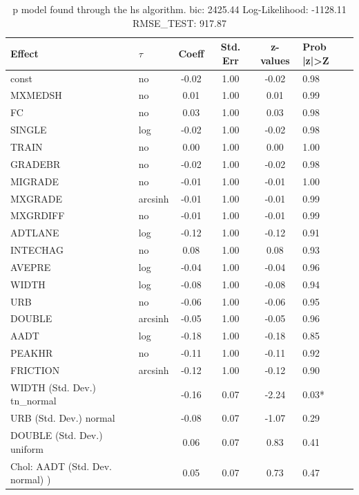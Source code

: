 \begin{table}
	\caption{p model found through the hs algorithm. bic: 2425.44 Log-Likelihood: -1128.11 RMSE_TEST: 917.87}
	\begin{center}
		\begin{tabular}{|l|l|c|c|c|l|}
			\hline
			Effect & $\tau$ & Coeff & Std. Err & z-values & Prob |z|>Z \\
			\hline
			const & no & -0.02 & 1.00 & -0.02 & 0.98 \\
			\hline
			MXMEDSH & no & 0.01 & 1.00 & 0.01 & 0.99 \\
			\hline
			FC & no & 0.03 & 1.00 & 0.03 & 0.98 \\
			\hline
			SINGLE & log & -0.02 & 1.00 & -0.02 & 0.98 \\
			\hline
			TRAIN & no & 0.00 & 1.00 & 0.00 & 1.00 \\
			\hline
			GRADEBR & no & -0.02 & 1.00 & -0.02 & 0.98 \\
			\hline
			MIGRADE & no & -0.01 & 1.00 & -0.01 & 1.00 \\
			\hline
			MXGRADE & arcsinh & -0.01 & 1.00 & -0.01 & 0.99 \\
			\hline
			MXGRDIFF & no & -0.01 & 1.00 & -0.01 & 0.99 \\
			\hline
			ADTLANE & log & -0.12 & 1.00 & -0.12 & 0.91 \\
			\hline
			INTECHAG & no & 0.08 & 1.00 & 0.08 & 0.93 \\
			\hline
			AVEPRE & log & -0.04 & 1.00 & -0.04 & 0.96 \\
			\hline
			WIDTH & log & -0.08 & 1.00 & -0.08 & 0.94 \\
			\hline
			URB & no & -0.06 & 1.00 & -0.06 & 0.95 \\
			\hline
			DOUBLE & arcsinh & -0.05 & 1.00 & -0.05 & 0.96 \\
			\hline
			AADT & log & -0.18 & 1.00 & -0.18 & 0.85 \\
			\hline
			PEAKHR & no & -0.11 & 1.00 & -0.11 & 0.92 \\
			\hline
			FRICTION & arcsinh & -0.12 & 1.00 & -0.12 & 0.90 \\
			\hline
			WIDTH (Std. Dev.) tn_normal &  & -0.16 & 0.07 & -2.24 & 0.03* \\
			\hline
			URB (Std. Dev.) normal &  & -0.08 & 0.07 & -1.07 & 0.29 \\
			\hline
			DOUBLE (Std. Dev.) uniform &  & 0.06 & 0.07 & 0.83 & 0.41 \\
			\hline
			 Chol: AADT (Std. Dev. normal) ) &  & 0.05 & 0.07 & 0.73 & 0.47 \\

\end{tabular}
\end{center}
\end{table}
